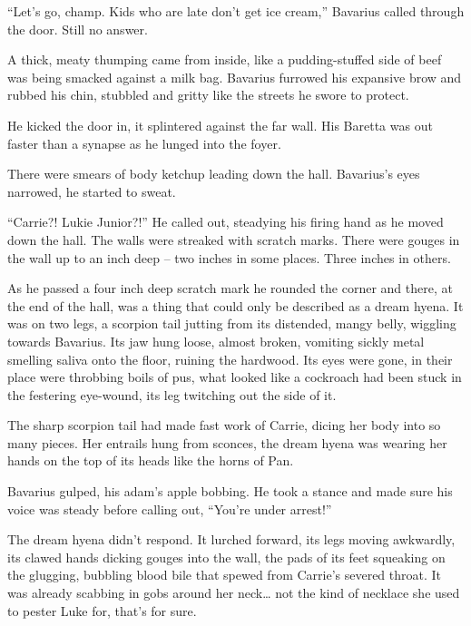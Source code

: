 ``Let's go, champ. Kids who are late don't get ice cream,'' Bavarius
called through the door. Still no answer.



A thick, meaty thumping came from inside, like a pudding-stuffed
side of beef was being smacked against a milk bag. Bavarius
furrowed his expansive brow and rubbed his chin, stubbled and
gritty like the streets he swore to protect.



He kicked the door in, it splintered against the far wall. His
Baretta was out faster than a synapse as he lunged into the
foyer.



There were smears of body ketchup leading down the hall. Bavarius's
eyes narrowed, he started to sweat.



``Carrie?! Lukie Junior?!'' He called out, steadying his firing hand
as he moved down the hall. The walls were streaked with scratch
marks. There were gouges in the wall up to an inch deep -- two
inches in some places. Three inches in others.



As he passed a four inch deep scratch mark he rounded the corner
and there, at the end of the hall, was a thing that could only be
described as a dream hyena. It was on two legs, a scorpion tail
jutting from its distended, mangy belly, wiggling towards Bavarius.
Its jaw hung loose, almost broken, vomiting sickly metal smelling
saliva onto the floor, ruining the hardwood. Its eyes were gone, in
their place were throbbing boils of pus, what looked like a
cockroach had been stuck in the festering eye-wound, its leg
twitching out the side of it.



The sharp scorpion tail had made fast work of Carrie, dicing her
body into so many pieces. Her entrails hung from sconces, the dream
hyena was wearing her hands on the top of its heads like the horns
of Pan.



Bavarius gulped, his adam's apple bobbing. He took a stance and
made sure his voice was steady before calling out, ``You're under
arrest!''



The dream hyena didn't respond. It lurched forward, its legs moving
awkwardly, its clawed hands dicking gouges into the wall, the pads
of its feet squeaking on the glugging, bubbling blood bile that
spewed from Carrie's severed throat. It was already scabbing in
gobs around her neck{\ldots} not the kind of necklace she used to pester
Luke for, that's for sure.



